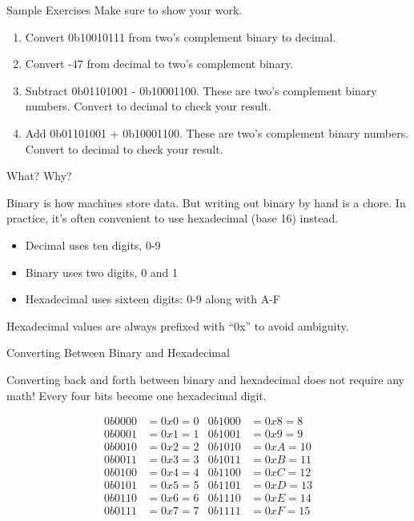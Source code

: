 \begin{frame}{Sample Exercises}
    Make sure to show your work.
    \begin{enumerate}
        \item Convert 0b10010111 from two's complement binary to decimal.
        \item Convert -47 from decimal to two's complement binary.
        \item Subtract 0b01101001 - 0b10001100. These are two's complement binary numbers.
              Convert to decimal to check your result.
        \item Add 0b01101001 + 0b10001100. These are two's complement binary numbers. Convert
              to decimal to check your result.
    \end{enumerate}
\end{frame}


\begin{frame}{What? Why?}

    Binary is how machines store data. But writing out binary by hand is a chore.
    In practice, it's often convenient to use hexadecimal (base 16) instead.

    \begin{itemize}
        \item Decimal uses ten digits, 0-9
        \item Binary uses two digits, 0 and 1
        \item Hexadecimal uses sixteen digits: 0-9 along with A-F
    \end{itemize}
    Hexadecimal values are always prefixed with ``0x'' to avoid ambiguity.
\end{frame}

\begin{frame}{Converting Between Binary and Hexadecimal}

    Converting back and forth between binary and hexadecimal does not require any
    math! Every four bits become one hexadecimal digit.

    \begin{align*}
        0b0000 & = 0x0 = 0 & 0b1000 & = 0x8 = 8  \\
        0b0001 & = 0x1 = 1 & 0b1001 & = 0x9 = 9  \\
        0b0010 & = 0x2 = 2 & 0b1010 & = 0xA = 10 \\
        0b0011 & = 0x3 = 3 & 0b1011 & = 0xB = 11 \\
        0b0100 & = 0x4 = 4 & 0b1100 & = 0xC = 12 \\
        0b0101 & = 0x5 = 5 & 0b1101 & = 0xD = 13 \\
        0b0110 & = 0x6 = 6 & 0b1110 & = 0xE = 14 \\
        0b0111 & = 0x7 = 7 & 0b1111 & = 0xF = 15 \\
    \end{align*}
\end{frame}


